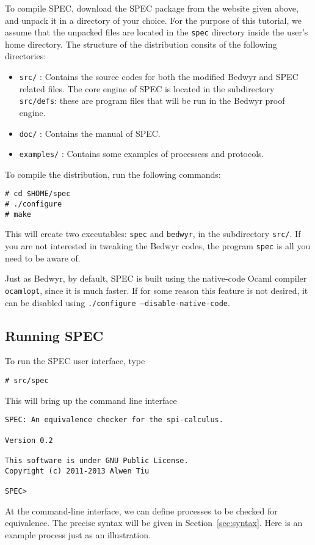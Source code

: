 \documentclass{article}
\newcommand\obj[1]{\texttt{#1}}
\begin{document}
To compile SPEC, download the SPEC package from the website given above, and
unpack it in a directory of your choice. For the purpose of this tutorial, we assume
that the unpacked files are located in the \obj{spec} directory inside
the user's home directory. 
The structure of the distribution consits of the following directories:
\begin{itemize}
\item \texttt{src/} : Contains the source codes for both the modified Bedwyr and SPEC related
files. The core engine of SPEC is located in the subdirectory \texttt{src/defs}: these are
program files that will be run in the Bedwyr proof engine. 

\item \texttt{doc/} : Contains the manual of SPEC.
\item \texttt{examples/} : Contains some examples of processess and protocols. 
\end{itemize}
To compile the distribution, run the following commands: 
\begin{verbatim}
# cd $HOME/spec
# ./configure
# make
\end{verbatim}
This will create two executables: \obj{spec} and \obj{bedwyr}, in the subdirectory \texttt{src/}.
If you are not interested in tweaking the Bedwyr codes, the program \texttt{spec} is all you
need to be aware of. 

Just as Bedwyr, by default, SPEC is built using the native-code Ocaml compiler \texttt{ocamlopt},
since it is much faster. If for some reason this feature is not desired, it can
be disabled using \texttt{./configure --disable-native-code}.

\subsection{Running SPEC}

To run the SPEC user interface, type
\begin{verbatim}
# src/spec
\end{verbatim}
This will bring up the command line interface
\begin{verbatim}
SPEC: An equivalence checker for the spi-calculus. 

Version 0.2

This software is under GNU Public License.
Copyright (c) 2011-2013 Alwen Tiu

SPEC> 

\end{verbatim}
At the command-line interface, we can define processes to be checked for equivalence.
The precise syntax will be given in Section~\ref{sec:syntax}. Here is an example process
just as an illustration. 
\end{document}
